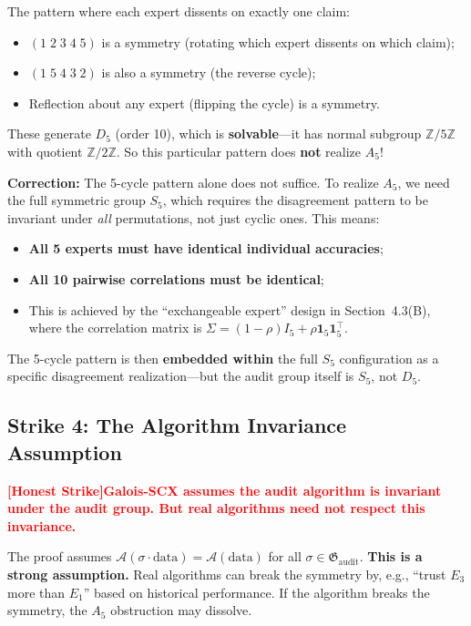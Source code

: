 \documentclass[12pt,a4paper]{article}
\theoremstyle{remark}
\newcommand{\Z}{\mathbb{Z}}
\newcommand{\AuditGrp}{\mathfrak{G}_{\mathrm{audit}}}
\newcommand{\honestcrit}[1]{%
    \textcolor{red}{\textbf{[Honest Strike]#1}}%
}
\begin{document}
The pattern where each expert dissents on exactly one claim:
\begin{itemize}
    \item \((1\;2\;3\;4\;5)\) is a symmetry (rotating which expert dissents on which claim);
    \item \((1\;5\;4\;3\;2)\) is also a symmetry (the reverse cycle);
    \item Reflection about any expert (flipping the cycle) is a symmetry.
\end{itemize}
These generate \(D_5\) (order 10), which is \textbf{solvable}---it has normal subgroup \(\Z/5\Z\) with quotient \(\Z/2\Z\). So this particular pattern does \textbf{not} realize \(A_5\)!

\textbf{Correction:} The 5-cycle pattern alone does not suffice. To realize \(A_5\), we need the full symmetric group \(S_5\), which requires the disagreement pattern to be invariant under \textit{all} permutations, not just cyclic ones. This means:
\begin{itemize}
    \item \textbf{All 5 experts must have identical individual accuracies};
    \item \textbf{All 10 pairwise correlations must be identical};
    \item This is achieved by the ``exchangeable expert'' design in Section~4.3(B), where the correlation matrix is \(\Sigma = (1-\rho)I_5 + \rho\mathbf{1}_5\mathbf{1}_5^\top\).
\end{itemize}

The 5-cycle pattern is then \textbf{embedded within} the full \(S_5\) configuration as a specific disagreement realization---but the audit group itself is \(S_5\), not \(D_5\).

\subsection{Strike 4: The Algorithm Invariance Assumption}
\honestcrit{Galois-SCX assumes the audit algorithm is invariant under the audit group. But real algorithms need not respect this invariance.}

The proof assumes \(\mathcal{A}(\sigma \cdot \text{data}) = \mathcal{A}(\text{data})\) for all \(\sigma \in \AuditGrp\). \textbf{This is a strong assumption.} Real algorithms can break the symmetry by, e.g., ``trust \(E_3\) more than \(E_1\)'' based on historical performance. If the algorithm breaks the symmetry, the \(A_5\) obstruction may dissolve.
\end{document}
